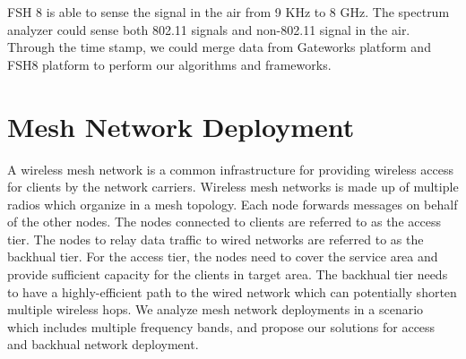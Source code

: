 FSH 8 is able to sense the signal in the air from 9 KHz to 
8 GHz. The spectrum analyzer could sense both 802.11 signals 
and non-802.11 signal in the air. Through the time stamp, 
we could merge data from Gateworks platform and FSH8 platform 
to perform our algorithms and frameworks.

\section{Mesh Network Deployment}

A wireless mesh network is a common infrastructure for providing 
wireless access for clients by the network carriers. Wireless 
mesh networks is made up of multiple radios which organize in a mesh 
topology. Each node forwards messages on behalf of the 
other nodes. The nodes connected to clients are referred to as the 
access tier. The nodes to relay data traffic to 
wired networks are referred to as the backhual tier. For the  access tier, the 
nodes need to cover the service area and provide sufficient 
capacity for the clients in target area. The backhual 
tier needs to have a highly-efficient path to the wired 
network which can potentially shorten multiple wireless hops. 
We analyze mesh network deployments in a scenario which includes multiple frequency bands, 
and propose our solutions for access and backhual 
network deployment.

